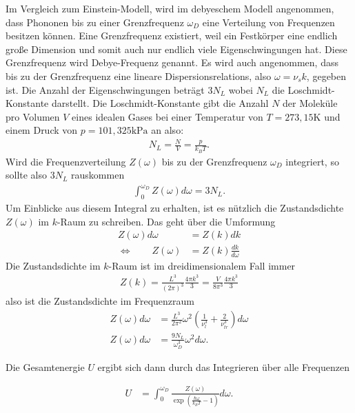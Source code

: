 Im Vergleich zum Einstein-Modell, wird im debyeschem Modell angenommen, dass Phononen bis zu einer Grenzfrequenz $\omega_D$ eine Verteilung von Frequenzen besitzen können. 
Eine Grenzfrequenz existiert, weil ein Festkörper eine endlich große Dimension und somit auch nur endlich viele Eigenschwingungen hat. Diese Grenzfrequenz wird Debye-Frequenz genannt. Es wird auch angenommen, 
dass bis zu der Grenzfrequenz eine lineare Dispersionsrelations, also $\omega = \nu_s k$, gegeben ist. 
Die Anzahl der Eigenschwingungen beträgt $3 N_L$ wobei $N_L$ die Loschmidt-Konstante darstellt. Die Loschmidt-Konstante gibt die Anzahl $N$ der Moleküle pro Volumen $V$ eines idealen Gases 
bei einer Temperatur von $T = 273,15 \si{\kelvin}$ und einem Druck von $p = 101,325 \si{\kilo\pascal}$ an also:
\begin{align}
    N_L = \frac{N}{V} = \frac{p}{k_B T}.
\end{align}
Wird die Frequenzverteilung $Z(\omega)$ bis zu der Grenzfrequenz $\omega_D$ integriert, so sollte also $3 N_L$ rauskommen
\begin{align}
    \label{eqn:Z_integral}
    \int_0^{\omega_D} Z(\omega) d\omega = 3 N_L .
\end{align}
Um Einblicke aus diesem Integral zu erhalten, ist es nützlich die Zustandsdichte $Z(\omega)$ im $k$-Raum zu schreiben. Das geht über die Umformung 
\begin{align}
    Z(\omega) d\omega &= Z(k) d k\\
    \Leftrightarrow \, \, \, \, \, \, \, \, \, \, \, \, Z(\omega) &= Z(k) \frac{d k}{d\omega}
\end{align}
Die Zustandsdichte im $k$-Raum ist im dreidimensionalem Fall immer 
\begin{align}
    Z(k) = \frac{L^3}{\left(2 \pi\right)^3} \frac{4 \pi k^3}{3} = \frac{V}{8 \pi^3} \frac{4 \pi k^3}{3}
\end{align}
also ist die Zustandsdichte im Frequenzraum
\begin{align}
    \label{eqn:Z}
    Z(\omega) d \omega &= \frac{L^3}{2 \pi^2} \omega^2 \left(\frac{1}{\nu^3_l} + \frac{2}{\nu^3_{tr}}\right) d\omega \\
    Z(\omega) d \omega &= \frac{9 N_L}{\omega_D^3} \omega^2 d \omega.
\end{align}

Die Gesamtenergie $U$ ergibt sich dann durch das Integrieren über alle Frequenzen

\begin{align}
    \label{eqn:udebye}
    U &= \int_0^{\omega_D} \frac{Z(\omega)}{\exp \left( \frac{\hbar \omega}{k_B T} - 1 \right)} d\omega.
\end{align}

